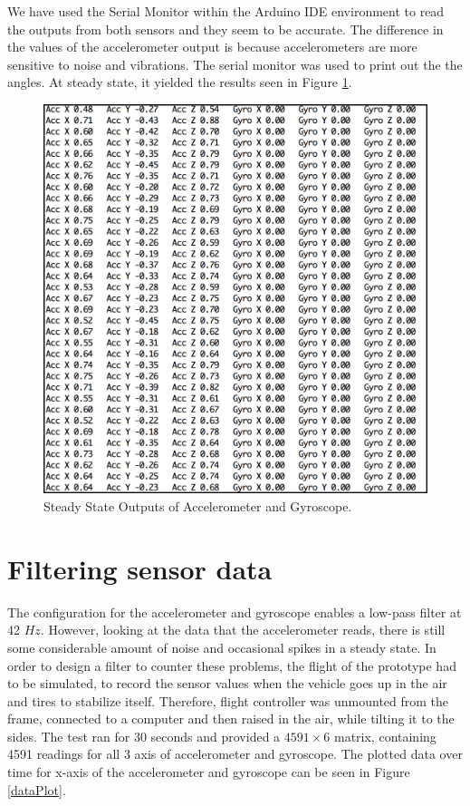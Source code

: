 

We have used the Serial Monitor within the Arduino IDE environment to read the outputs from both sensors and they seem to be accurate. The difference in the values of the accelerometer output is because accelerometers are more sensitive to noise and vibrations.
The serial monitor was used to print out the the angles. At steady state, it yielded the results seen in Figure \ref{angles}.

\begin{figure}[H]
  \centering
    \includegraphics[width=1\textwidth]{images/accgy.png}
	\caption{Steady State Outputs of Accelerometer and Gyroscope.}
	\label{angles}
\end{figure}

\section{Filtering sensor data}
The configuration for the accelerometer and gyroscope enables a low-pass filter at 42 $Hz$. However, looking at the data that the accelerometer reads, there is still some considerable amount of noise and occasional spikes in a steady state. In order to design a filter to counter these problems, the flight of the prototype had to be simulated, to record the sensor values when the vehicle goes up in the air and tires to stabilize itself. Therefore, flight controller was unmounted from the frame, connected to a computer and then raised in the air, while tilting it to the sides. The test ran for 30 seconds and provided a $4591\times 6$ matrix, containing 4591 readings for all 3 axis of accelerometer and gyroscope. The plotted data over time for x-axis of the accelerometer and gyroscope can be seen in Figure \ref{dataPlot}.

